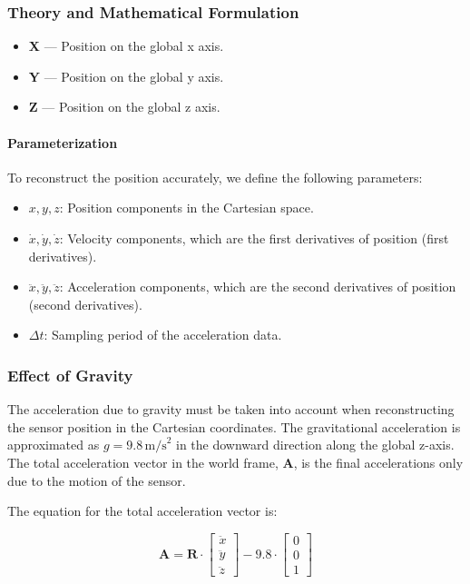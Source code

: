\documentclass[12pt]{article}
\begin{document}
\subsubsection{Theory and Mathematical Formulation}

\begin{itemize}
    \item \textbf{X} — Position on the global x axis.  
    \item \textbf{Y} — Position on the global y axis.
    \item \textbf{Z} — Position on the global z axis.
\end{itemize}

\paragraph{Parameterization}

To reconstruct the position accurately, we define the following parameters:
\begin{itemize}
    \item \( x, y, z \): Position components in the Cartesian space.
    \item \(\dot{x},\dot{y},\dot{z}\): Velocity components, which are the first derivatives of position (first derivatives).
    \item \(\ddot{x},\ddot{y},\ddot{z}\): Acceleration components, which are the second derivatives of position (second derivatives).
    \item \(\Delta{t}\): Sampling period of the acceleration data. 
\end{itemize} 

\subsubsection{Effect of Gravity}

The acceleration due to gravity must be taken into account when reconstructing the sensor position in the Cartesian coordinates. The gravitational acceleration is approximated as \( g = 9.8 \, \text{m/s}^2 \) in the downward direction along the global z-axis. The total acceleration vector in the world frame, \( \mathbf{A} \), is the final accelerations only due to the motion of the sensor.

The equation for the total acceleration vector is:

\[
\mathbf{A} = \mathbf{R} \cdot \begin{bmatrix} \ddot{x} \\ \ddot{y} \\ \ddot{z} \end{bmatrix} - 9.8 \cdot \begin{bmatrix} 0 \\ 0 \\ 1 \end{bmatrix}
\]
\end{document}

